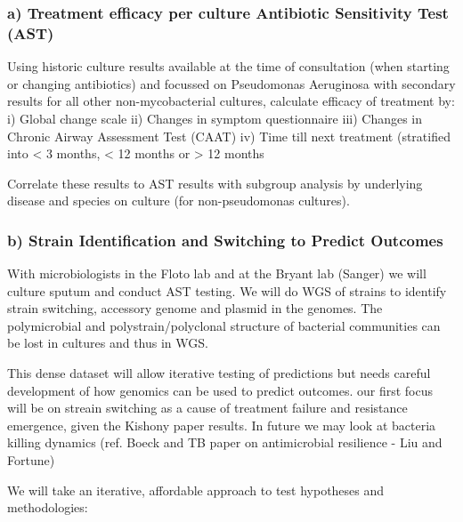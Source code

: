 \documentclass{article}
\begin{document}
\subsubsection*{a) Treatment efficacy per culture Antibiotic Sensitivity Test (AST)}
Using historic culture results available at the time of consultation (when starting or changing antibiotics) 
and focussed on Pseudomonas Aeruginosa with secondary results for all other non-mycobacterial cultures, 
calculate efficacy of treatment by:
i)  Global change scale
ii)  Changes in symptom questionnaire
iii)  Changes in Chronic Airway Assessment Test (CAAT)
iv)  Time till next treatment (stratified into < 3 months, < 12 months or > 12 months

Correlate these results to AST results with subgroup analysis by underlying disease 
and species on culture (for non-pseudomonas cultures).  

\subsubsection*{b) Strain Identification and Switching to Predict Outcomes}
With microbiologists in the Floto lab and at the Bryant lab (Sanger) we will culture sputum and conduct AST testing. 
We will do WGS of strains to identify strain switching, accessory genome and plasmid in the genomes. 
The polymicrobial and polystrain/polyclonal structure of bacterial communities can be lost in cultures and thus in WGS.  

This dense dataset will allow iterative testing of predictions but needs 
careful development of how genomics can be used to predict outcomes.
our first focus will be on streain switching as a cause of treatment failure and resistance emergence, 
given the Kishony paper results. 
In future we may look at bacteria killing dynamics (ref. Boeck and TB paper on antimicrobial resilience - Liu and Fortune)

We will take an iterative, affordable approach to test hypotheses and methodologies:
\end{document}
